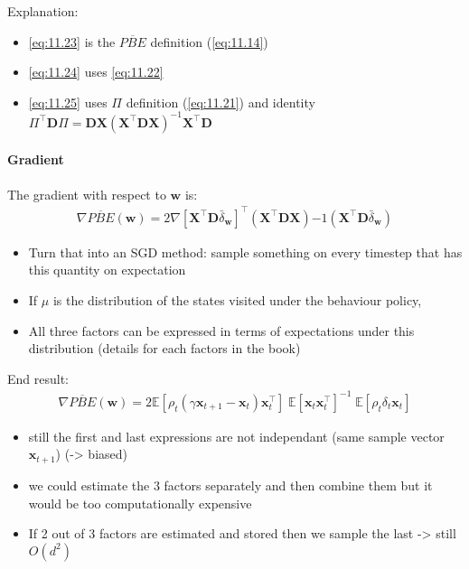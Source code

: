 \documentclass[sutton_barto_notes.tex]{subfiles}
\begin{document}
 Explanation: 
\begin{itemize}
\item \ref{eq:11.23} is the $\overline{PBE}$ definition (\ref{eq:11.14}) 
\item \ref{eq:11.24} uses \ref{eq:11.22} 
\item \ref{eq:11.25} uses $\Pi$ definition (\ref{eq:11.21}) and identity $\Pi^{\top} \mathbf{D} \Pi = \mathbf{D} \mathbf{X} (\mathbf{X}^{\top} \mathbf{D} \mathbf{X})^{-1} \mathbf{X}^{\top} \mathbf{D}$ 
\end{itemize}

 \paragraph{Gradient}  
The gradient with respect to $\mathbf{w}$ is: 
\begin{align}
\nabla \overline{PBE}(\mathbf{w}) = 2 \nabla [\mathbf{X}^{\top} \mathbf{D} \bar{\delta}_{\mathbf{w}}]^{\top} (\mathbf{X}^{\top} \mathbf{D} \mathbf{X}){-1} (\mathbf{X}^{\top} \mathbf{D} \bar{\delta}_{\mathbf{w}}) \label{eq:11.27}\tag{11.27}
\end{align}

\begin{itemize}
\item Turn that into an SGD method: sample something on every timestep that has this quantity on expectation 
\item If $\mu$ is the distribution of the states visited under the behaviour policy, 
\item All three factors can be expressed in terms of expectations under this distribution (details for each factors in the book) 
\end{itemize}
 End result: 
\begin{align}
\nabla \overline{PBE}(\mathbf{w}) = 2 \mathbb{E}[\rho_t(\gamma \mathbf{x}_{t+1} -  \mathbf{x}_t)\mathbf{x}_t^{\top}] \; \mathbb{E}[\mathbf{x}_t \mathbf{x}_t^{\top}]^{-1} \; \mathbb{E}[\rho_t \delta_t \mathbf{x}_t] \label{eq:11.28}\tag{11.28}
\end{align}


\begin{itemize}
\item still the first and last expressions are not independant (same sample vector $\mathbf{x}_{t+1}$) (-> biased) 
\item we could estimate the 3 factors separately and then combine them but it would be too computationally expensive 
\item If 2 out of 3 factors are estimated and stored then we sample the last -> still $O(d^2)$ 
\end{itemize}
\end{document}
